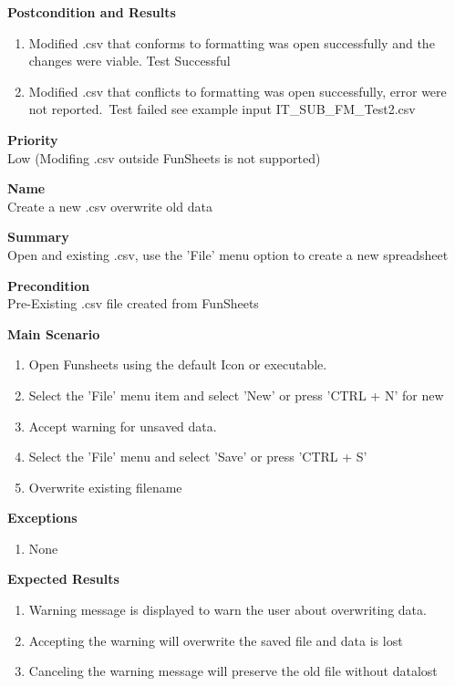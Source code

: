 \documentclass[12pt]{article}
\begin{document}
\noindent

{\bf Postcondition and Results}\\
\begin{enumerate}
\item Modified .csv that conforms to formatting was open successfully and the changes were viable. Test Successful
\item Modified .csv that conflicts to formatting was open successfully, error were not reported.\ 
Test failed see example input IT\_SUB\_FM\_Test2.csv
\end{enumerate}

\noindent
{\bf Priority}\\
Low (Modifing .csv outside FunSheets is not supported)
\noindent

\clearpage


\noindent
{\bf Name}\\
Create a new .csv overwrite old data

\noindent
{\bf Summary}\\
Open and existing .csv, use the 'File' menu option to create a new spreadsheet

\noindent
{\bf Precondition}\\
Pre-Existing .csv file created from FunSheets

\noindent
{\bf Main Scenario}\\
\vspace*{-0.2in}
\begin{enumerate}
\item Open Funsheets using the default Icon or executable.
\item Select the 'File' menu item and select 'New' or press 'CTRL + N' for new
\item Accept warning for unsaved data.
\item Select the 'File' menu and select 'Save' or press 'CTRL + S'
\item Overwrite existing filename
\end{enumerate}

{\bf Exceptions}\
\begin{enumerate}
\item None
\end{enumerate}

{\bf Expected Results}\
\begin{enumerate}
\item Warning message is displayed to warn the user about overwriting data.
\item Accepting the warning will overwrite the saved file and data is lost
\item Canceling the warning message will preserve the old file without datalost
\end{enumerate}
\end{document}
